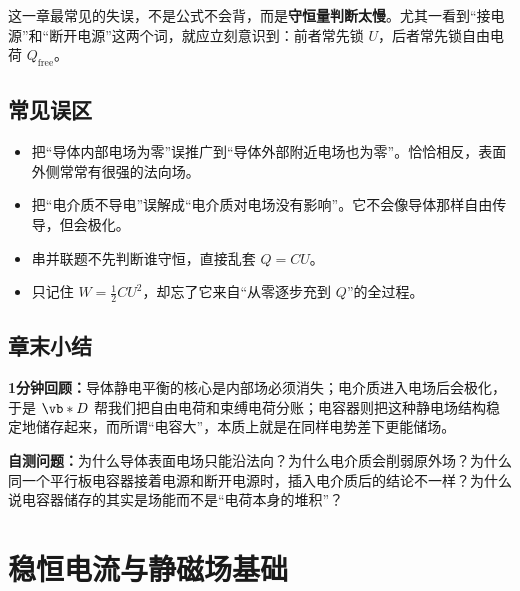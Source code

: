 \documentclass[lang=cn,11pt]{elegantbook}
\newcommand{\summaryline}[1]{\par\noindent\textbf{1分钟回顾：}#1\par}
\newcommand{\chapterselfcheck}[1]{\par\noindent\textbf{自测问题：}#1\par}
\begin{document}
\begin{remark}
这一章最常见的失误，不是公式不会背，而是\textbf{守恒量判断太慢}。尤其一看到“接电源”和“断开电源”这两个词，就应立刻意识到：前者常先锁 \(U\)，后者常先锁自由电荷 \(Q_{\mathrm{free}}\)。
\end{remark}

\section{常见误区}

\begin{itemize}
 \item 把“导体内部电场为零”误推广到“导体外部附近电场也为零”。恰恰相反，表面外侧常常有很强的法向场。
 \item 把“电介质不导电”误解成“电介质对电场没有影响”。它不会像导体那样自由传导，但会极化。
 \item 串并联题不先判断谁守恒，直接乱套 \(Q=CU\)。
 \item 只记住 \(W=\frac12 CU^2\)，却忘了它来自“从零逐步充到 \(Q\)”的全过程。
\end{itemize}

\section{章末小结}

\summaryline{导体静电平衡的核心是内部场必须消失；电介质进入电场后会极化，于是 \(\vb*{D}\) 帮我们把自由电荷和束缚电荷分账；电容器则把这种静电场结构稳定地储存起来，而所谓“电容大”，本质上就是在同样电势差下更能储场。}
\chapterselfcheck{为什么导体表面电场只能沿法向？为什么电介质会削弱原外场？为什么同一个平行板电容器接着电源和断开电源时，插入电介质后的结论不一样？为什么说电容器储存的其实是场能而不是“电荷本身的堆积”？}

\chapter{稳恒电流与静磁场基础}
\end{document}

